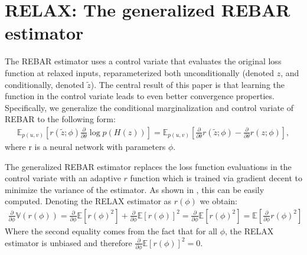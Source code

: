 \documentclass{article}
\newcommand{\relaxed}{r}
\newcommand{\var}{\mathbb{V}}
\begin{document}
\section{RELAX: The generalized REBAR estimator}
The REBAR estimator uses a control variate that evaluates the original loss function at relaxed inputs, reparameterized both unconditionally (denoted $z$, and conditionally, denoted $\tilde{z}$).
The central result of this paper is that learning the function in the control variate leads to even better convergence properties.
Specifically, we generalize the conditional marginalization and control variate of REBAR to the following form:
\begin{align}
    \mathbb{E}_{p(u,v)}[\relaxed (\tilde{z};\phi)\frac{\partial}{\partial \theta}\log p(H(z))] = \mathbb{E}_{p(u,v)}[\frac{\partial}{\partial \theta} \relaxed(\tilde{z};\phi) - \frac{\partial}{\partial \theta} \relaxed(z; \phi)],
\end{align}
where \relaxed{} is a neural network with parameters $\phi$.

The generalized REBAR estimator replaces the loss function evaluations in the control variate with an adaptive $\relaxed$ function which is trained via gradient decent to minimize the variance of the estimator. As shown in \cite{tucker2017rebar}, this can be easily computed. Denoting the RELAX estimator as $r(\phi)$ we obtain:
\begin{align}
    \frac{\partial}{\partial\phi}\var{(r(\phi))} = \frac{\partial}{\partial\phi}\mathbb{E}[r(\phi)^2] + \frac{\partial}{\partial\phi}\mathbb{E}[r(\phi)]^2 = \frac{\partial}{\partial\phi}\mathbb{E}[r(\phi)^2] = \mathbb{E}[\frac{\partial}{\partial\phi}r(\phi)^2]
\end{align}
Where the second equality comes from the fact that for all $\phi$, the RELAX estimator is unbiased and therefore $\frac{\partial}{\partial\phi}\mathbb{E}[r(\phi)]^2 = 0$.





\end{document}
